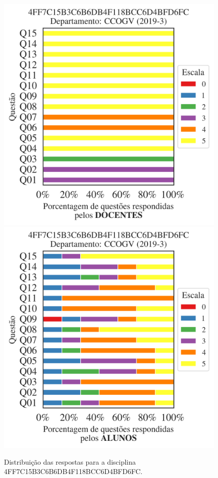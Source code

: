 \documentclass[a4paper,10pt]{article}
\begin{document}
\begin{figure}[h]
\centering
\includegraphics[width=0.485\linewidth]{analise_disciplina_departamento_CCOGV_4FF7C15B3C6B6DB4F118BCC6D4BFD6FC_docentes.png}
\includegraphics[width=0.485\linewidth]{analise_disciplina_departamento_CCOGV_4FF7C15B3C6B6DB4F118BCC6D4BFD6FC_alunos.png}
\caption{\label{fig:analise_geral_departamento}                Distribuição das respostas para a disciplina 4FF7C15B3C6B6DB4F118BCC6D4BFD6FC. }
\end{figure}
\end{document}
